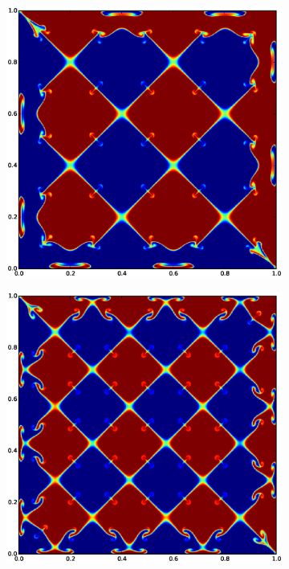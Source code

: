 \begin{figure}
\begin{subfigure}[b]{0.32\textwidth}
  \includegraphics[width=\textwidth]{figs/scalar-25-20}
\end{subfigure}
\begin{subfigure}[b]{0.32\textwidth}
  \includegraphics[width=\textwidth]{figs/scalar-35-20}

\end{subfigure}
\end{figure}
